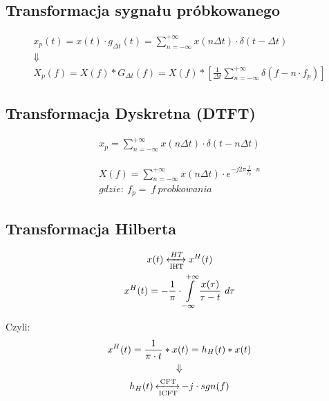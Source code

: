     \subsection{Transformacja sygnału próbkowanego}
        \begin{gather*}
            x_p(t) = x(t)\cdot g_{\Delta t}(t) = \sum_{n=-\infty}^{+\infty}x(n\Delta t)\cdot\delta(t-\Delta t)\\
            \Downarrow\\
            X_p(f) = X(f) * G_{\Delta t}(f) = X(f) * \left[\frac{1}{\Delta t} \sum_{n=-\infty}^{+\infty}\delta(f-n\cdot f_p)\right]
        \end{gather*}

    \subsection{Transformacja Dyskretna (DTFT)}
         \begin{multicols}{2}
            \begin{gather*}
                x_p = \sum\limits_{n=-\infty}^{+\infty}x(n\Delta t)\cdot \delta(t-n\Delta t)
            \end{gather*}

            \begin{gather*}
                X(f) = \sum\limits_{n = -\infty}^{+\infty}x(n\Delta t) \cdot e^{-j2 \pi \frac{f}{f_{p}}\cdot n}\\
                gdzie:\ f_p =\ f\ probkowania
            \end{gather*}
         \end{multicols}

    \subsection{Transformacja Hilberta}
        \begin{multicols}{2}
            \begin{gather*}
                x(t) \xleftrightarrow[\text{IHT}]{HT} x^H(t)\\
                x^H(t) = -\frac{1}{\pi}  \cdot \int\limits_{-\infty}^{+\infty}\frac{x(\tau)}{\tau-t}\ d\tau
            \end{gather*}

            \indent Czyli:
            \begin{gather*}
                x^H(t) = \frac{1}{\pi\cdot t}*x(t) = h_H(t)*x(t)\\
                \Downarrow\\
                h_H(t) \operatorname{\xleftrightarrow[\text{ICFT}]{\text{CFT}}} -j \cdot sgn(f)
            \end{gather*}
        \end{multicols}

        
